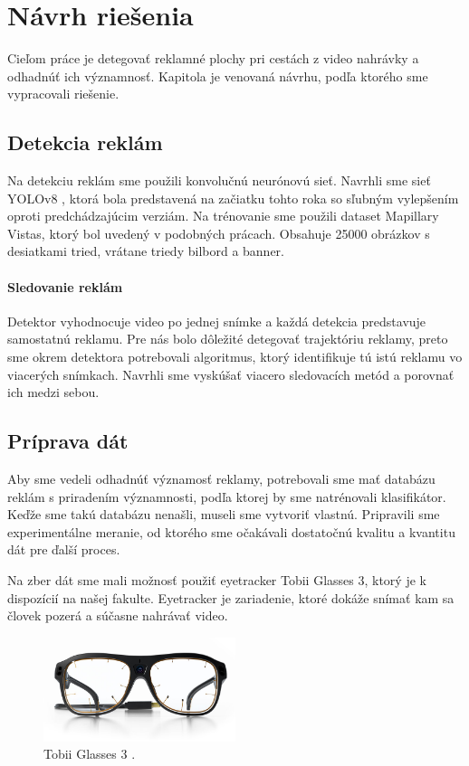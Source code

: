 \chapter{Návrh riešenia}\label{chap:proposal}

Cieľom práce je detegovať reklamné plochy pri cestách z video nahrávky a odhadnúť ich významnosť. Kapitola je venovaná návrhu, podľa ktorého sme vypracovali riešenie.  

\section{Detekcia reklám}

Na detekciu reklám sme použili konvolučnú neurónovú sieť. Navrhli sme sieť YOLOv8 \cite{yolov8}, ktorá bola predstavená na začiatku tohto roka so sľubným vylepšením oproti predchádzajúcim verziám. Na trénovanie sme použili dataset Mapillary Vistas, ktorý bol uvedený v podobných prácach. Obsahuje 25000 obrázkov s desiatkami tried, vrátane triedy bilbord a banner.


\subsubsection{Sledovanie reklám}

Detektor vyhodnocuje video po jednej snímke a každá detekcia predstavuje samostatnú reklamu. Pre nás bolo dôležité detegovať trajektóriu reklamy, preto sme okrem detektora potrebovali algoritmus, ktorý identifikuje tú istú reklamu vo viacerých snímkach. Navrhli sme vyskúšať viacero sledovacích metód a porovnať ich medzi sebou.

\section{Príprava dát}

Aby sme vedeli odhadnúť významosť reklamy, potrebovali sme mať databázu reklám s priradením významnosti, podľa ktorej by sme natrénovali klasifikátor. Keďže sme takú databázu nenašli, museli sme vytvoriť vlastnú. Pripravili sme experimentálne meranie, od ktorého sme očakávali dostatočnú kvalitu a kvantitu dát pre ďalší proces.

Na zber dát sme mali možnosť použiť eyetracker Tobii Glasses 3, ktorý je k dispozícií na našej fakulte. Eyetracker je zariadenie, ktoré dokáže snímať kam sa človek pozerá a súčasne nahrávať video.

\begin{figure}[ht]
    \centering
    \includegraphics[width=0.5\textwidth]{images/03/glasses.jpg}
    \caption{Tobii Glasses 3 \cite{tobii}.}
    \label{img:tobii}
\end{figure}

